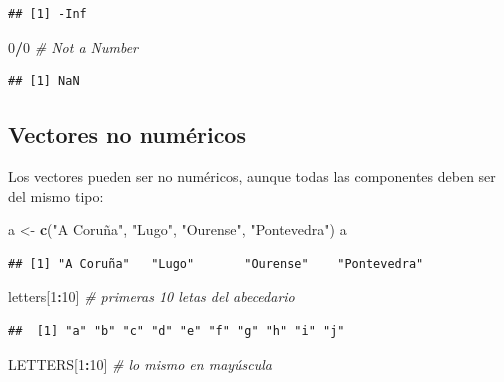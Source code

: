 \documentclass[]{book}
\newenvironment{Shaded}{\begin{snugshade}}{\end{snugshade}}
\newcommand{\KeywordTok}[1]{\textcolor[rgb]{0.13,0.29,0.53}{\textbf{#1}}}
\newcommand{\DecValTok}[1]{\textcolor[rgb]{0.00,0.00,0.81}{#1}}
\newcommand{\StringTok}[1]{\textcolor[rgb]{0.31,0.60,0.02}{#1}}
\newcommand{\CommentTok}[1]{\textcolor[rgb]{0.56,0.35,0.01}{\textit{#1}}}
\newcommand{\OperatorTok}[1]{\textcolor[rgb]{0.81,0.36,0.00}{\textbf{#1}}}
\newcommand{\NormalTok}[1]{#1}
\begin{document}
\begin{verbatim}
## [1] -Inf
\end{verbatim}

\begin{Shaded}
\begin{Highlighting}[]
\DecValTok{0}\OperatorTok{/}\DecValTok{0}  \CommentTok{# Not a Number}
\end{Highlighting}
\end{Shaded}

\begin{verbatim}
## [1] NaN
\end{verbatim}

\subsection{Vectores no numéricos}\label{vectores-no-numericos}

Los vectores pueden ser no numéricos, aunque todas las componentes deben
ser del mismo tipo:

\begin{Shaded}
\begin{Highlighting}[]
\NormalTok{a <-}\StringTok{ }\KeywordTok{c}\NormalTok{(}\StringTok{"A Coruña"}\NormalTok{, }\StringTok{"Lugo"}\NormalTok{, }\StringTok{"Ourense"}\NormalTok{, }\StringTok{"Pontevedra"}\NormalTok{)}
\NormalTok{a}
\end{Highlighting}
\end{Shaded}

\begin{verbatim}
## [1] "A Coruña"   "Lugo"       "Ourense"    "Pontevedra"
\end{verbatim}

\begin{Shaded}
\begin{Highlighting}[]
\NormalTok{letters[}\DecValTok{1}\OperatorTok{:}\DecValTok{10}\NormalTok{]  }\CommentTok{# primeras 10 letas del abecedario}
\end{Highlighting}
\end{Shaded}

\begin{verbatim}
##  [1] "a" "b" "c" "d" "e" "f" "g" "h" "i" "j"
\end{verbatim}

\begin{Shaded}
\begin{Highlighting}[]
\NormalTok{LETTERS[}\DecValTok{1}\OperatorTok{:}\DecValTok{10}\NormalTok{]  }\CommentTok{# lo mismo en mayúscula}
\end{Highlighting}
\end{Shaded}
\end{document}
